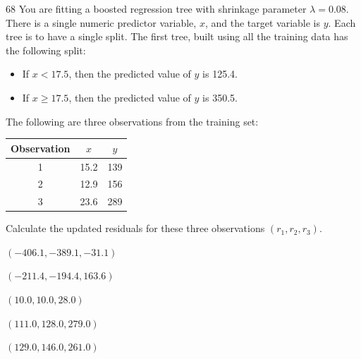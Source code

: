 \begin{question}{68}
You are fitting a boosted regression tree with shrinkage parameter $\lambda = 0.08$. There is a single numeric predictor variable, $x$, and the target variable is $y$. Each tree is to have a single split. The first tree, built using all the training data has the following split:
\begin{itemize}
\item If $x < 17.5$, then the predicted value of $y$ is 125.4.
\item If $x \geqslant 17.5$, then the predicted value of $y$ is 350.5.
\end{itemize}
The following are three observations from the training set:
\begin{center}
\begin{tabular}{|c|c|c|}
\hline
Observation & $x$ & $y$ \\ \hline
1 & 15.2 & 139 \\ \hline
2 & 12.9 & 156 \\ \hline
3 & 23.6 & 289 \\ \hline
\end{tabular}
\end{center}

Calculate the updated residuals for these three observations $(r_1, r_2, r_3)$.

\begin{choices}
\item $(-406.1, -389.1, -31.1)$
\item $(-211.4, -194.4, 163.6)$
\item $(10.0, 10.0, 28.0)$
\item $(111.0, 128.0, 279.0)$
\item $(129.0, 146.0, 261.0)$
\end{choices}
\end{question}
